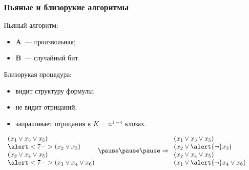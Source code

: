 \begin{frame}
	\frametitle{Пьяные и близорукие алгоритмы}
    \pause

    \begin{definition}
        Пьяный алгоритм:
        \begin{itemize}
	        \item $\mathbf{A}$~--- произвольная;
	        \item $\mathbf{B}$~--- случайный бит.
        \end{itemize}
    \end{definition}

    \pause
    \begin{definition}
        Близорукая процедура:
        \pause
        \begin{itemize}
	        \item видит структуру формулы;
        	\pause
        	\item не видит отрицаний;
        	\item<6-> запрашивает отрицания в $K = n^{1 - \epsilon}$ клозах.
        \end{itemize}
    \end{definition}

    \pause
    $\begin{array}{l}
        (x_1 \vee x_3 \vee x_5) \\
        \alert<7->{(x_2 \vee x_3)} \\
        (x_2 \vee x_4 \vee x_5) \\
        \alert<7->{(x_1 \vee x_4 \vee x_6)} \\
    \end{array}
    \pause
    \pause
    \pause
    \Rightarrow
    \begin{array}{l}
        (x_1 \vee x_3 \vee x_5) \\
        (x_2 \vee \alert{\neg} x_3) \\
        (x_2 \vee x_4 \vee x_5) \\
        (x_1 \vee \alert{\neg} x_4 \vee x_6) \\
    \end{array}$
    
\end{frame}

